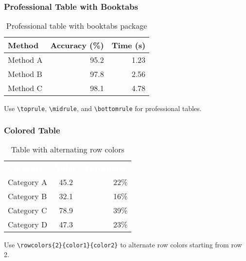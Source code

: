 \documentclass[aspectratio=169,professionalfonts]{beamer}
\begin{document}
\begin{frame}
    \frametitle{Professional Table with Booktabs}
    
    \begin{table}
        \centering
        \begin{tabular}{lrr}
            \toprule
            \textbf{Method} & \textbf{Accuracy (\%)} & \textbf{Time (s)} \\
            \midrule
            Method A & 95.2 & 1.23 \\
            Method B & 97.8 & 2.56 \\
            Method C & 98.1 & 4.78 \\
            \bottomrule
        \end{tabular}
        \caption{Professional table with booktabs package}
    \end{table}
    
    \begin{tcolorbox}[colback=ugmLightGrey,colframe=ugmBlue,title=Booktabs Tip]
        Use \texttt{\textbackslash toprule}, \texttt{\textbackslash midrule}, and \texttt{\textbackslash bottomrule} for professional tables.
    \end{tcolorbox}
\end{frame}

\begin{frame}
    \frametitle{Colored Table}
    
    \begin{table}
        \centering
        \begin{tabular}{lcr}
            \rowcolor{ugmBlue!40}
            \textcolor{white}{\textbf{Category}} & \textcolor{white}{\textbf{Value}} & \textcolor{white}{\textbf{Percentage}} \\
            Category A & 45.2 & 22\% \\
            Category B & 32.1 & 16\% \\
            Category C & 78.9 & 39\% \\
            Category D & 47.3 & 23\% \\
        \end{tabular}
        \caption{Table with alternating row colors}
    \end{table}
    
    \begin{tcolorbox}[colback=ugmLightGrey,colframe=ugmBlue,title=Color Tip]
        Use \texttt{\textbackslash rowcolors\{2\}\{color1\}\{color2\}} to alternate row colors starting from row 2.
    \end{tcolorbox}
\end{frame}
\end{document}
